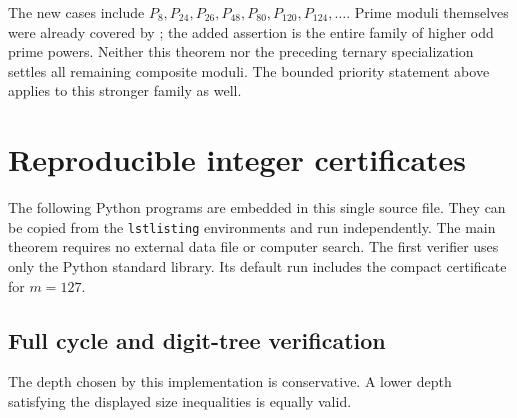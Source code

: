 \documentclass[11pt,a4paper]{article}
\theoremstyle{definition}\newtheorem{definition}[theorem]{Definition}
\theoremstyle{remark}\newtheorem{remark}[theorem]{Remark}
\begin{document}
The new cases include $P_8,P_{24},P_{26},P_{48},P_{80},P_{120},
P_{124},\ldots$. Prime moduli themselves were already covered by
\cite{Kang2026}; the added assertion is the entire family of higher
odd prime powers. Neither this theorem nor the preceding ternary
specialization settles all remaining composite moduli. The bounded
priority statement above applies to this stronger family as well.
\section{Reproducible integer certificates}\label{app:code}
The following Python programs are embedded in this single source file.
They can be copied from the \texttt{lstlisting} environments and run
independently. The main theorem requires no external data file or
computer search. The first verifier uses only the Python standard library.
Its default run includes the compact certificate for $m=127$.

\subsection{Full cycle and digit-tree verification}
The depth chosen by this implementation is conservative. A lower depth
satisfying the displayed size inequalities is equally valid.
\end{document}
